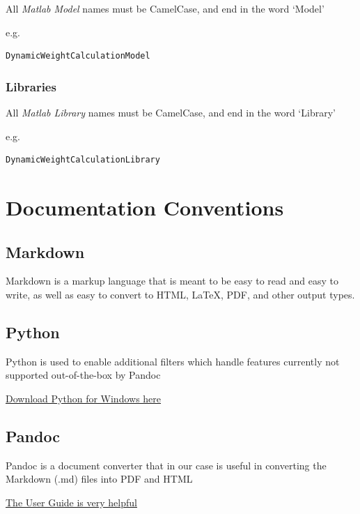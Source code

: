 \documentclass[]{article}
\begin{document}
All \emph{Matlab Model} names must be CamelCase, and end in the word
`Model'

e.g.

\begin{verbatim}
DynamicWeightCalculationModel
\end{verbatim}

\subsubsection{Libraries}\label{libraries-1}

All \emph{Matlab Library} names must be CamelCase, and end in the word
`Library'

e.g.

\begin{verbatim}
DynamicWeightCalculationLibrary
\end{verbatim}

\section{Documentation Conventions}\label{documentation-conventions}

\subsection{Markdown}\label{markdown}

Markdown is a markup language that is meant to be easy to read and easy
to write, as well as easy to convert to HTML, LaTeX, PDF, and other
output types.

\subsection{Python}\label{python}

Python is used to enable additional filters which handle features
currently not supported out-of-the-box by Pandoc

\href{https://www.python.org/downloads/windows/}{Download Python for
Windows here}

\subsection{Pandoc}\label{pandoc}

Pandoc is a document converter that in our case is useful in converting
the Markdown (.md) files into PDF and HTML

\href{http://pandoc.org/README.html}{The User Guide is very helpful}
\end{document}
